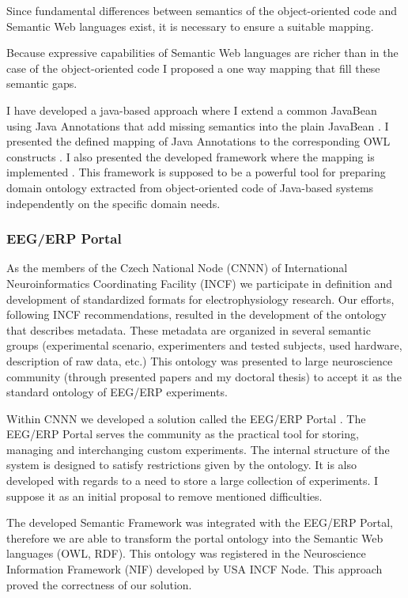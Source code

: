 \documentclass[a4paper, 10pt]{article}
\begin{document}
Since fundamental differences between semantics of the object-oriented code and Semantic Web languages exist, it is necessary to ensure a suitable mapping.

Because expressive capabilities of Semantic Web languages are richer than in the case of the object-oriented code I proposed a one way mapping that fill these semantic gaps.

I have developed a java-based approach where I extend a common JavaBean using Java Annotations that add missing semantics into the plain JavaBean \cite{Jezek10}. I presented the defined mapping of Java Annotations to the corresponding OWL constructs \cite{DBLP:conf/iceis/JezekM11}. I also presented the developed framework where the mapping is implemented \cite{DBLP:conf/biostec/JezekM12}. This framework is supposed to be a powerful tool for preparing domain ontology extracted from object-oriented code of Java-based systems independently on the specific domain needs.


\subsubsection*{EEG/ERP Portal}

As the members of the Czech National Node (CNNN) of International Neuroinformatics Coordinating Facility (INCF) we participate in definition and development of standardized formats
for electrophysiology research. Our efforts, following INCF recommendations, resulted in the development of the ontology that describes metadata. These metadata are organized in
several semantic groups (experimental scenario, experimenters and tested subjects, used hardware, description of raw data, etc.) This ontology was presented to large neuroscience community (through presented papers and my doctoral thesis) to accept it as the standard ontology of EEG/ERP experiments.

Within CNNN we developed a solution called the EEG/ERP Portal \cite{DBLP:conf/biostec/JezekM10, NNW}. The EEG/ERP Portal serves the community as the practical tool for storing, managing and interchanging custom experiments. The internal structure of the system is designed to satisfy restrictions given by the ontology. It is also developed with regards to a need to store a large collection of experiments. I suppose it as an initial proposal to remove mentioned difficulties.

The developed Semantic Framework was integrated \cite{DBLP:conf/biostec/MoucekJP11} with the EEG/ERP Portal, therefore we are able to transform the portal ontology into the Semantic Web languages (OWL, RDF). This ontology was registered in the  Neuroscience Information Framework (NIF) \cite{DBLP:conf/bmei/JezekM11} developed by USA INCF Node. This approach proved the correctness of our solution.
\end{document}
